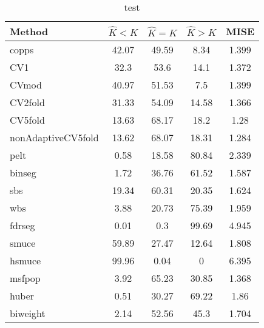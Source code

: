 \begin{table}[ht]
\centering
\begin{tabular}{l|cccc}
  \hline
Method & $\hat{K} < K$ & $\hat{K} = K$ & $\hat{K} > K$ & MISE \\ 
  \hline
copps & 42.07 & 49.59 &  8.34 & 1.399 \\ 
  CV1 &  32.3 &  53.6 &  14.1 & 1.372 \\ 
  CVmod & 40.97 & 51.53 &   7.5 & 1.399 \\ 
  CV2fold & 31.33 & 54.09 & 14.58 & 1.366 \\ 
  CV5fold & 13.63 & 68.17 &  18.2 &  1.28 \\ 
  nonAdaptiveCV5fold & 13.62 & 68.07 & 18.31 & 1.284 \\ 
  pelt &  0.58 & 18.58 & 80.84 & 2.339 \\ 
  binseg &  1.72 & 36.76 & 61.52 & 1.587 \\ 
  sbs & 19.34 & 60.31 & 20.35 & 1.624 \\ 
  wbs &  3.88 & 20.73 & 75.39 & 1.959 \\ 
  fdrseg &  0.01 &   0.3 & 99.69 & 4.945 \\ 
  smuce & 59.89 & 27.47 & 12.64 & 1.808 \\ 
  hsmuce & 99.96 &  0.04 &     0 & 6.395 \\ 
  msfpop &  3.92 & 65.23 & 30.85 & 1.368 \\ 
  huber &  0.51 & 30.27 & 69.22 &  1.86 \\ 
  biweight &  2.14 & 52.56 &  45.3 & 1.704 \\ 
   \hline
\end{tabular}
\caption{test} 
\end{table}
